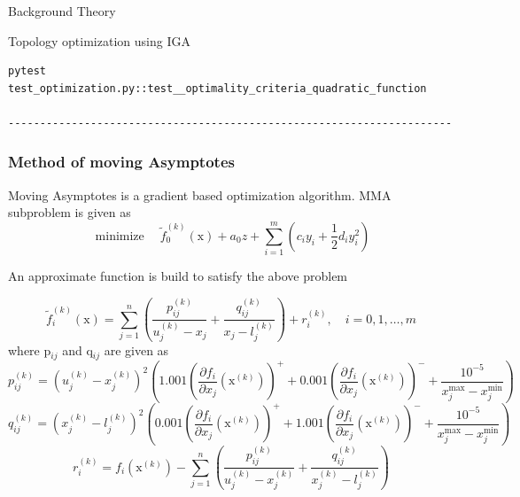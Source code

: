 \documentclass[a4paper,12pt,times]{article}
\begin{document}
\begin{section}{Background Theory}
\begin{subsection}{Topology optimization using IGA}
\begin{verbatim}
pytest test_optimization.py::test__optimality_criteria_quadratic_function

----------------------------------------------------------------------
\end{verbatim}




\subsubsection{Method of moving Asymptotes }

Moving Asymptotes is a gradient based optimization algorithm.
MMA subproblem is given as
\begin{equation}
\operatorname{minimize} \quad \tilde{f}_{0}^{(k)}(\mathrm{x})+a_{0} z+\sum_{i=1}^{m}\left(c_{i} y_{i}+\frac{1}{2} d_{i} y_{i}^{2}\right)
\end{equation}


An approximate function is build to satisfy the above problem

\begin{equation}
\tilde{f}_{i}^{(k)}(\mathrm{x})=\sum_{j=1}^{n}\left(\frac{p_{i j}^{(k)}}{u_{j}^{(k)}-x_{j}}+\frac{q_{i j}^{(k)}}{x_{j}-l_{j}^{(k)}}\right)+r_{i}^{(k)}, \quad i=0,1, \ldots, m
\end{equation}
where p$_{i j}$ and q$_{i j}$ are given as
\begin{equation}
p_{i j}^{(k)}=\left(u_{j}^{(k)}-x_{j}^{(k)}\right)^{2}\left(1.001\left(\frac{\partial f_{i}}{\partial x_{j}}\left(\mathrm{x}^{(k)}\right)\right)^{+}+0.001\left(\frac{\partial f_{i}}{\partial x_{j}}\left(\mathrm{x}^{(k)}\right)\right)^{-}+\frac{10^{-5}}{x_{j}^{\max }-x_{j}^{\min }}\right)
\end{equation}
\begin{equation}
q_{i j}^{(k)}=\left(x_{j}^{(k)}-l_{j}^{(k)}\right)^{2}\left(0.001\left(\frac{\partial f_{i}}{\partial x_{j}}\left(\mathrm{x}^{(k)}\right)\right)^{+}+1.001\left(\frac{\partial f_{i}}{\partial x_{j}}\left(\mathrm{x}^{(k)}\right)\right)^{-}+\frac{10^{-5}}{x_{j}^{\max }-x_{j}^{\min }}\right)
\end{equation}
\begin{equation}
r_{i}^{(k)}=f_{i}\left(\mathrm{x}^{(k)}\right)-\sum_{j=1}^{n}\left(\frac{p_{i j}^{(k)}}{u_{j}^{(k)}-x_{j}^{(k)}}+\frac{q_{i j}^{(k)}}{x_{j}^{(k)}-l_{j}^{(k)}}\right)
\end{equation}


\end{subsection}
\end{section}
\end{document}
